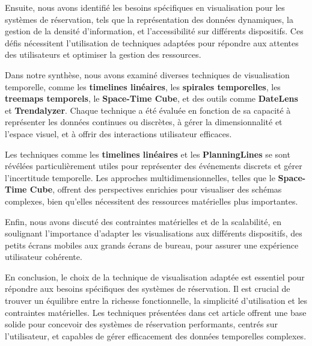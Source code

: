 \documentclass[runningheads]{llncs}
\begin{document}
Ensuite, nous avons identifié les besoins spécifiques en visualisation pour les systèmes de réservation, tels que la représentation des données dynamiques, la gestion de la densité d'information, et l'accessibilité sur différents dispositifs. Ces défis nécessitent l'utilisation de techniques adaptées pour répondre aux attentes des utilisateurs et optimiser la gestion des ressources.

Dans notre synthèse, nous avons examiné diverses techniques de visualisation temporelle, comme les \textbf{timelines linéaires}, les \textbf{spirales temporelles}, les \textbf{treemaps temporels}, le \textbf{Space-Time Cube}, et des outils comme \textbf{DateLens} et \textbf{Trendalyzer}. Chaque technique a été évaluée en fonction de sa capacité à représenter les données continues ou discrètes, à gérer la dimensionnalité et l'espace visuel, et à offrir des interactions utilisateur efficaces.

Les techniques comme les \textbf{timelines linéaires} et les \textbf{PlanningLines} se sont révélées particulièrement utiles pour représenter des événements discrets et gérer l'incertitude temporelle. Les approches multidimensionnelles, telles que le \textbf{Space-Time Cube}, offrent des perspectives enrichies pour visualiser des schémas complexes, bien qu'elles nécessitent des ressources matérielles plus importantes.

Enfin, nous avons discuté des contraintes matérielles et de la scalabilité, en soulignant l'importance d'adapter les visualisations aux différents dispositifs, des petits écrans mobiles aux grands écrans de bureau, pour assurer une expérience utilisateur cohérente.

En conclusion, le choix de la technique de visualisation adaptée est essentiel pour répondre aux besoins spécifiques des systèmes de réservation. Il est crucial de trouver un équilibre entre la richesse fonctionnelle, la simplicité d'utilisation et les contraintes matérielles. Les techniques présentées dans cet article offrent une base solide pour concevoir des systèmes de réservation performants, centrés sur l'utilisateur, et capables de gérer efficacement des données temporelles complexes.




\end{document}
